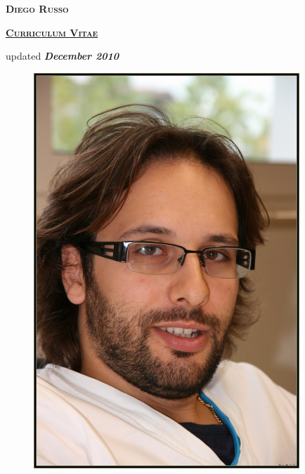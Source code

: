 \documentclass[totpages,helvetica,openbib,english]{europecv}
\begin{document}
    \begin{center}
        \hspace{1pt}
        \vspace{2cm}
    
        {\scshape \textbf{\Huge Diego Russo}}
    
        \vspace{1cm}
    
        {\scshape \textbf{\Large \underline{Curriculum Vitae}}}
    
        \vspace{0.25cm}
    
        {\large updated \emph{\textbf{December 2010}}}
        
        \vspace{2cm}
        
        \begin{figure}[htbp] 
            \begin{center} 
                \includegraphics[width=10cm]{io.jpg}
            \end{center} 
        \end{figure}
        
    \end{center}
\pagebreak
{}
\end{document}
